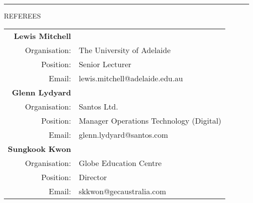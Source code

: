 \documentclass{article}
\newcommand{\HRule}{\rule{\linewidth}{0.5mm}}
\begin{document}
\HRule


{\footnotesize REFEREES}

\begin{center}



\begin{tabular}[H]{ r l}
\textbf{\large Lewis Mitchell} & \\[0.3cm]
Organisation: & The University of Adelaide \\
Position: & Senior Lecturer \\
Email: & lewis.mitchell@adelaide.edu.au \\[1cm]

\textbf{\large Glenn Lydyard} & \\[0.3cm]
Organisation: & Santos Ltd. \\
Position: & Manager Operations Technology (Digital)\\
Email: & glenn.lydyard@santos.com \\[1cm]

\textbf{\large Sungkook Kwon} & \\[0.3cm]
Organisation: & Globe Education Centre \\
Position: & Director \\
Email: & skkwon@gecaustralia.com \\[1cm]

\end{tabular}

\end{center}
\end{document}
